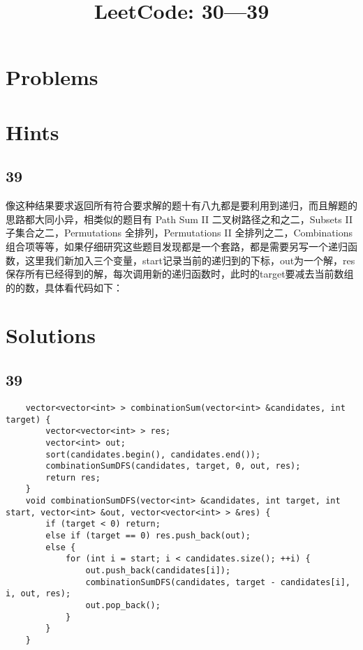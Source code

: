 \documentclass[12pt,a4paper]{article}
\begin{document}
	\title{LeetCode: 30---39}
	\maketitle
	\section*{Problems}
	\section*{Hints}
	\subsection*{39}
	\begin{CJK}{UTF8}{gbsn}
	像这种结果要求返回所有符合要求解的题十有八九都是要利用到递归，而且解题的思路都大同小异，相类似的题目有 Path Sum II 二叉树路径之和之二，Subsets II 子集合之二，Permutations 全排列，Permutations II 全排列之二，Combinations 组合项等等，如果仔细研究这些题目发现都是一个套路，都是需要另写一个递归函数，这里我们新加入三个变量，start记录当前的递归到的下标，out为一个解，res保存所有已经得到的解，每次调用新的递归函数时，此时的target要减去当前数组的的数，具体看代码如下：
	\end{CJK}
	\section*{Solutions}
	\subsection*{39}
	\begin{lstlisting}
	vector<vector<int> > combinationSum(vector<int> &candidates, int target) {
        vector<vector<int> > res;
        vector<int> out;
        sort(candidates.begin(), candidates.end());
        combinationSumDFS(candidates, target, 0, out, res);
        return res;
    }
    void combinationSumDFS(vector<int> &candidates, int target, int start, vector<int> &out, vector<vector<int> > &res) {
        if (target < 0) return;
        else if (target == 0) res.push_back(out);
        else {
            for (int i = start; i < candidates.size(); ++i) {
                out.push_back(candidates[i]);
                combinationSumDFS(candidates, target - candidates[i], i, out, res);
                out.pop_back();
            }
        }
    }
	\end{lstlisting}
\end{document}
